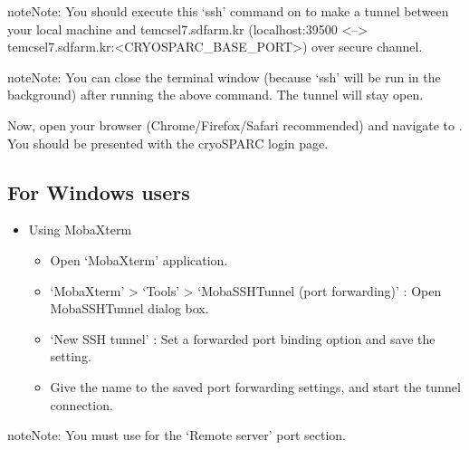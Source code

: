 \documentclass[a4paper,11pt,english]{sphinxmanual}
\begin{document}
\begin{sphinxadmonition}{note}{Note:}
\sphinxAtStartPar
You should execute this ‘ssh’ command on  to make a tunnel between
your local machine and tem\sphinxhyphen{}cs\sphinxhyphen{}el7.sdfarm.kr (localhost:39500 <–> tem\sphinxhyphen{}cs\sphinxhyphen{}el7.sdfarm.kr:<CRYOSPARC\_BASE\_PORT>) over secure channel.
\end{sphinxadmonition}

\begin{sphinxadmonition}{note}{Note:}
\sphinxAtStartPar
You can close the terminal window (because ‘ssh’ will be run in the background) after running the above command. The tunnel will stay open.
\end{sphinxadmonition}

\sphinxAtStartPar
Now, open your browser (Chrome/Firefox/Safari recommended) and navigate to . You should be presented with the cryoSPARC login page.


\subsection{For Windows users}
\label{\detokenize{cryoSPARC:for-windows-users}}\begin{itemize}
\item {} 
\sphinxAtStartPar
Using MobaXterm
\begin{itemize}
\item {} 
\sphinxAtStartPar
Open ‘MobaXterm’ application.

\item {} 
\sphinxAtStartPar
‘MobaXterm’ \sphinxhyphen{}> ‘Tools’ \sphinxhyphen{}> ‘MobaSSHTunnel (port forwarding)’ : Open MobaSSHTunnel dialog box.

\item {} 
\sphinxAtStartPar
‘New SSH tunnel’ : Set a forwarded port binding option and save the setting.

\item {} 
\sphinxAtStartPar
Give the name to the saved port forwarding settings, and start the tunnel connection.

\end{itemize}

\end{itemize}

\begin{sphinxadmonition}{note}{Note:}
\sphinxAtStartPar
You must use  for the ‘Remote server’ port section.
\end{sphinxadmonition}
\end{document}
